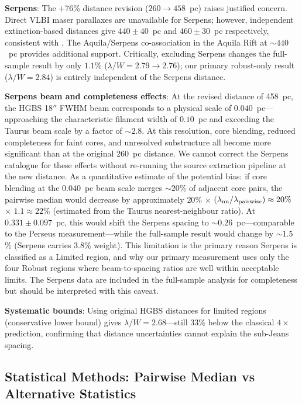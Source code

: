 \documentclass[twoside,twocolumn]{mnras}
\begin{document}
\textbf{Serpens}: The +76\% distance revision ($260 \to 458$~pc) raises justified
concern. Direct VLBI maser parallaxes are unavailable for Serpens; however, independent
extinction-based distances \citep{Yan2022, Green2024} give $440 \pm 40$~pc and
$460 \pm 30$~pc respectively, consistent with \citealt{Zhang2023}. The Aquila/Serpens
co-association in the Aquila Rift at ${\sim}440$~pc \citep{Zucker2020} provides
additional support. Critically, excluding Serpens changes the full-sample
result by only $1.1\%$ ($\lambda/W = 2.79 \to 2.76$); our primary robust-only
result ($\lambda/W = 2.84$) is entirely independent of the Serpens distance.

\textbf{Serpens beam and completeness effects}: At the revised distance of 458~pc,
the HGBS 18$''$ FWHM beam corresponds to a physical scale of $0.040$~pc---approaching
the characteristic filament width of $0.10$~pc and exceeding the Taurus beam scale by
a factor of $\sim 2.8$. At this resolution, core blending, reduced completeness for
faint cores, and unresolved substructure all become more significant than at the
original 260~pc distance. We cannot correct the Serpens catalogue for these effects
without re-running the source extraction pipeline at the new distance. As a quantitative estimate of the potential bias: if core blending at the $0.040$~pc beam scale merges ${\sim}20$\% of adjacent core pairs, the pairwise median would decrease by approximately $20$\% $\times$ $(\lambda_{\rm nn}/\lambda_{\rm pairwise}) \approx 20\%$ $\times$ $1.1 \approx 22$\% (estimated from the Taurus nearest-neighbour ratio). At $0.331 \pm 0.097$~pc, this would shift the Serpens spacing to ${\sim}0.26$~pc---comparable to the Perseus measurement---while the full-sample result would change by ${\sim}1.5$\% (Serpens carries 3.8\% weight). This limitation
is the primary reason Serpens is classified as a Limited region, and why our primary
measurement uses only the four Robust regions where beam-to-spacing ratios are well
within acceptable limits. The Serpens data are included in the full-sample analysis for
completeness but should be interpreted with this caveat.

\textbf{Systematic bounds}: Using original HGBS distances for limited regions
(conservative lower bound) gives $\lambda/W = 2.68$---still 33\% below the classical
$4\times$ prediction, confirming that distance uncertainties cannot explain the
sub-Jeans spacing.

\subsection{Statistical Methods: Pairwise Median vs Alternative Statistics}
\label{sec:statistics}
\end{document}
